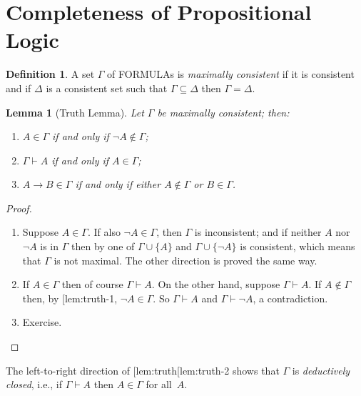 \documentclass[10pt,a4paper]{article}
\makeatletter
\newcommand*{\olup}[1]{\MakeUppercase{#1}}
\theoremstyle{plain}
\newtheorem{lem}[thm]{Lemma}
\theoremstyle{definition}
\newtheorem{defn}[thm]{Definition}
\theoremstyle{remark}
\newcommand*{\olfileid}[3]{}
\newcommand*{\olsection}[1]{\section*{#1}}
\newcommand*{\ollabel}[1]{\label{#1}}
\newcommand{\olref}{\@ifnextchar[{\olref@i}{\olref@final}}
\def\olref@i[#1]{\@ifnextchar[{\olref@ii}{\olref@final}}
\def\olref@ii[#1]{\@ifnextchar[{\olref@iii}{\olref@final}}
\def\olref@iii[#1]{\olref@final}
\def\olref@final#1{\ref{#1}}
\providecommand{\lif}{\mathbin{\rightarrow}}
\providecommand{\Proves}{\mathrel{\vdash}}
\makeatother
\begin{document}



\olfileid{pl}{prp}{com}

\olsection{Completeness of Propositional Logic}

\begin{defn}
\ollabel{def:MaxCon}
A set $\Gamma$ of \olup{formula}s is \emph{maximally consistent} if it is
consistent and if $\Delta$ is a consistent set such that $\Gamma
\subseteq \Delta$ then $\Gamma = \Delta$.
\end{defn}

\begin{lem}[Truth Lemma]
  \ollabel{lem:truth}
Let $\Gamma$ be maximally consistent; then:
\begin{enumerate}
\item \ollabel{lem:truth-1} $A \in \Gamma$ if and only if $\lnot A
  \notin \Gamma$;
\item \ollabel{lem:truth-2} $\Gamma \Proves A$ if and only if $A \in \Gamma$; 
\item \ollabel{lem:truth-3} $A \lif B \in \Gamma$ if and only if
  either $A \notin \Gamma$ or $B \in \Gamma$.
\end{enumerate}
\end{lem}

\begin{proof}
\begin{enumerate}
\item Suppose $A \in \Gamma$. If also $\lnot A \in \Gamma$, then
  $\Gamma$ is inconsistent; and if neither $A$ nor $\lnot A$ is in
  $\Gamma$ then by \olref[axd]{prop:phi} one of $\Gamma\cup\{A\}$ and
  $\Gamma \cup \{\lnot A\}$ is consistent, which means that $\Gamma$
  is not maximal. The other direction is proved the same way.
\item If $A \in \Gamma$ then of course $\Gamma \Proves A$.  On the
  other hand, suppose $\Gamma \Proves A$. If $A \notin \Gamma$ then,
  by \olref{lem:truth-1}, $\lnot A \in \Gamma$.  So $\Gamma \Proves
  A$ and $\Gamma \Proves \lnot A$, a contradiction.
\item Exercise.
\end{enumerate}
\end{proof}

The left-to-right direction of \olref{lem:truth}\olref{lem:truth-2} shows that
$\Gamma$ is \emph{deductively closed}, i.e., if $\Gamma \Proves A$ then $A
\in \Gamma$ for all~$A$.
\end{document}
